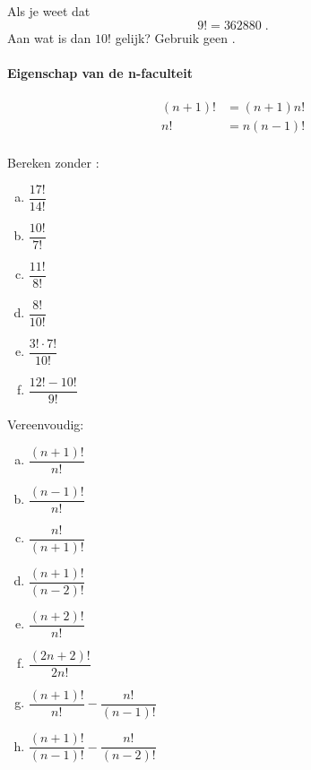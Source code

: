 \documentclass[12pt,twoside]{article}
\begin{document}
\begin{oefening}
Als je weet dat
$$9!=362880\;.$$
Aan wat is dan $10!$ gelijk? Gebruik geen .
\end{oefening}

\begin{cursus}

\paragraph*{Eigenschap van de n-faculteit}
\begin{mdframed}
\begin{align*}
  (n+1)!&=(n+1)n!\\
  n!&=n(n-1)!\\
\end{align*}
\end{mdframed}

\end{cursus}

\begin{oefening}
Bereken zonder :
\begin{multicols}{3}
\begin{enumerate}[(a)]
  \itemsep0.7em
  \item $\dfrac{17!}{14!}$
  \item $\dfrac{10!}{7!}$
  \item $\dfrac{11!}{8!}$
  \item $\dfrac{8!}{10!}$
  \item $\dfrac{3!\cdot 7!}{10!}$
  \item $\dfrac{12!-10!}{9!}$
\end{enumerate}
\end{multicols}
\end{oefening}

\begin{oefening}
Vereenvoudig:
\begin{multicols}{2}
\begin{enumerate}[(a)]
  \itemsep0.7em
  \item $\dfrac{(n+1)!}{n!}$
  \item $\dfrac{(n-1)!}{n!}$
  \item $\dfrac{n!}{(n+1)!}$
  \item $\dfrac{(n+1)!}{(n-2)!}$
  \item $\dfrac{(n+2)!}{n!}$
  \item $\dfrac{(2n+2)!}{2n!}$
  \item $\dfrac{(n+1)!}{n!}-\dfrac{n!}{(n-1)!}$
  \item $\dfrac{(n+1)!}{(n-1)!}-\dfrac{n!}{(n-2)!}$
\end{enumerate}
\end{multicols}
\end{oefening}
\end{document}

